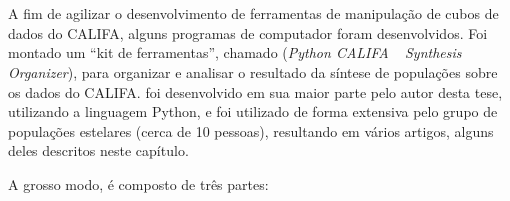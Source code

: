 


\chapter{\pycasso}
\label{sec:pycasso}

A fim de agilizar o desenvolvimento de ferramentas de manipulação de cubos de
dados do CALIFA, alguns programas de computador foram desenvolvidos. Foi montado
um ``kit de ferramentas'', chamado \pycasso ({\em Python CALIFA} \starlight\ {\em
Synthesis Organizer}), para organizar e analisar o resultado da síntese de
populações sobre os dados do CALIFA. \pycasso foi desenvolvido em sua maior parte
pelo autor desta tese, utilizando a linguagem Python, e foi utilizado de forma
extensiva pelo grupo de populações estelares (cerca de 10 pessoas), resultando
em vários artigos, alguns deles descritos neste capítulo.

A grosso modo, \pycasso é composto de três partes:


